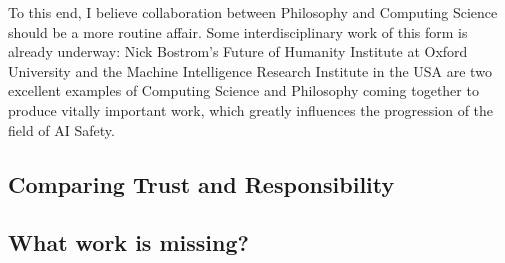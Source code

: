 To this end, I believe collaboration between Philosophy and Computing Science should be a more routine affair. Some interdisciplinary work of this form is already underway: Nick Bostrom's Future of Humanity Institute at Oxford University and the Machine Intelligence Research Institute in the USA are two excellent examples of Computing Science and Philosophy coming together to produce vitally important work, which greatly influences the progression of the field of AI Safety.\par


\subsection{Comparing Trust and Responsibility}


\subsection{What work is missing?}

